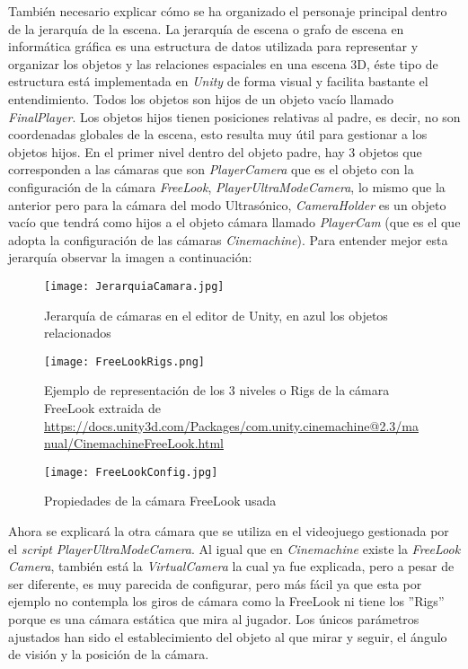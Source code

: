 También necesario explicar cómo se ha organizado el personaje principal dentro de la jerarquía de la escena. La jerarquía de escena o grafo de escena en informática gráfica es una estructura de datos utilizada para representar y organizar los objetos y las relaciones espaciales en una escena 3D, éste tipo de estructura está implementada en \textit{Unity} de forma visual y facilita bastante el entendimiento. Todos los objetos son hijos de un objeto vacío llamado \textit{FinalPlayer}. Los objetos hijos tienen posiciones relativas al padre, es decir, no son coordenadas globales de la escena, esto resulta muy útil para gestionar a los objetos hijos. En el primer nivel dentro del objeto padre, hay 3 objetos que corresponden a las cámaras que son \textit{PlayerCamera} que es el objeto con la configuración de la cámara \textit{FreeLook}, \textit{PlayerUltraModeCamera}, lo mismo que la anterior pero para la cámara del modo Ultrasónico, \textit{CameraHolder} es un objeto vacío que tendrá como hijos a el objeto cámara llamado \textit{PlayerCam} (que es el que adopta la configuración de las cámaras \textit{Cinemachine}). Para entender mejor esta jerarquía observar la imagen a continuación: 

\begin{figure}[H]
    \centering
    \texttt{[image: JerarquiaCamara.jpg]}
    \caption{Jerarquía de cámaras en el editor de Unity, en azul los objetos relacionados}
\end{figure}

\begin{figure}[H]
    \centering
    \texttt{[image: FreeLookRigs.png]}
    \caption{Ejemplo de representación de los 3 niveles o Rigs de la cámara FreeLook extraida de \url{https://docs.unity3d.com/Packages/com.unity.cinemachine@2.3/manual/CinemachineFreeLook.html}}
    \label{fig:rigsCamera}
\end{figure}

\begin{figure}[H]
    \centering
    \texttt{[image: FreeLookConfig.jpg]}
    \caption{Propiedades de la cámara FreeLook usada}
    \label{fig:propiedadesCamera}
\end{figure}

Ahora se explicará la otra cámara que se utiliza en el videojuego gestionada por el \textit{script} \textit{PlayerUltraModeCamera}. Al igual que en \textit{Cinemachine} existe la \textit{FreeLook Camera}, también está la \textit{VirtualCamera} la cual ya fue explicada, pero a pesar de ser diferente, es muy parecida de configurar, pero más fácil ya que esta por ejemplo no contempla los giros de cámara como la FreeLook ni tiene los ''Rigs'' porque es una cámara estática que mira al jugador. Los únicos parámetros ajustados han sido el establecimiento del objeto al que mirar y seguir, el ángulo de visión y la posición de la cámara. 

